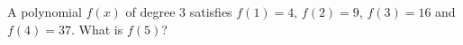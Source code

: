 A polynomial $f(x)$ of degree $3$ satisfies $f(1)=4$, $f(2)=9$, $f(3)=16$ and $f(4)=37$. What is $f(5)$?
